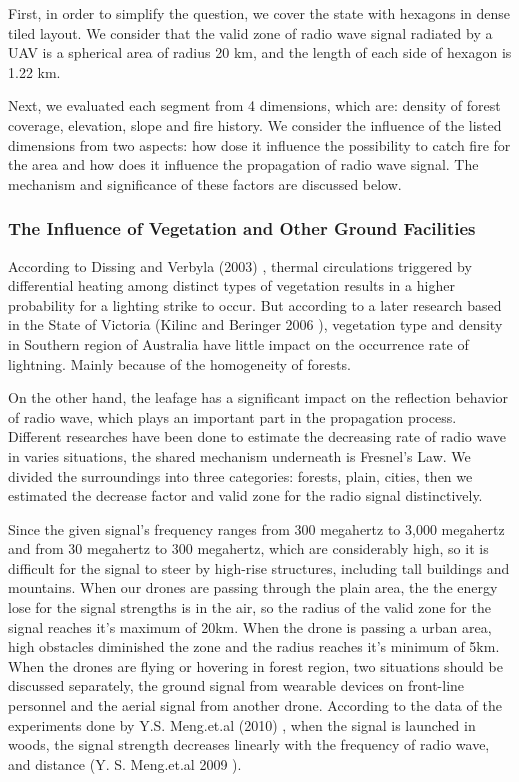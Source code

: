 \documentclass[13pt]{ctexart} %
\begin{document}
First, in order to simplify the question, we cover the state with hexagons in dense tiled layout. We consider that the valid zone of radio wave signal radiated by a UAV is a spherical area of radius 20 km, and the length of each side of hexagon is 1.22 km.

Next, we evaluated each segment from 4 dimensions, which are: density of forest coverage, elevation, slope and fire history. We consider the influence of the listed dimensions from two aspects: how dose it influence the possibility to catch fire for the area and how does it influence the propagation of radio wave signal. The mechanism and significance of these factors are discussed below.

\subsubsection{The Influence of Vegetation and Other Ground Facilities}
According to Dissing and Verbyla (2003) \cite{Dorte-lightning01}, thermal circulations triggered by differential heating among distinct types of vegetation results in a higher probability for a lighting strike to occur. But according to a later research based in the State of Victoria (Kilinc and Beringer 2006 \cite{Musa-lightning02}), vegetation type and density in Southern region of Australia have little impact on the occurrence rate of lightning. Mainly because of the homogeneity of forests.

On the other hand, the leafage has a significant impact on the reflection behavior of radio wave, which plays an important part in the propagation process. Different researches have been done to estimate the decreasing rate of radio wave in varies situations, the shared mechanism underneath is Fresnel's Law. We divided the surroundings into three categories: forests, plain, cities, then we estimated the decrease factor and valid zone for the radio signal distinctively.

Since the given signal's frequency ranges from 300 megahertz to 3,000 megahertz and from 30 megahertz to 300 megahertz, which are considerably high, so it is difficult for the signal to steer by high-rise structures, including tall buildings and mountains. When our drones are passing through the plain area, the the energy lose for the signal strengths is in the air, so the radius of the valid zone for the signal reaches it's maximum of 20km. When the drone is passing a urban area, high obstacles diminished the zone and the radius reaches it's minimum of 5km. When the drones are flying or hovering in forest region, two situations should be discussed separately, the ground signal from wearable devices on front-line personnel and the aerial signal from another drone. According to the data of the experiments done by Y.S. Meng.et.al (2010) \cite{Ng-vhf-radio}, when the signal is launched in woods, the signal strength decreases linearly with the frequency of radio wave, and distance (Y. S. Meng.et.al 2009 \cite{Ng-vhfuhf-ieee}).
\end{document}
